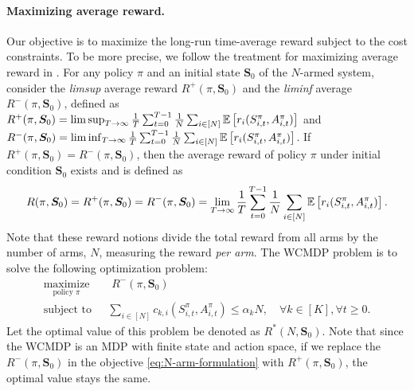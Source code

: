 \documentclass[11pt,letterpaper]{article}
\begin{document}
\paragraph{Maximizing average reward.}
Our objective is to maximize the long-run time-average reward subject to the cost constraints.
To be more precise, we follow the treatment for maximizing average reward in \citep{Put_05}. 
For any policy $\pi$ and an initial state $\bm{S}_0$ of the $N$-armed system, 
consider the \emph{limsup} average reward $R^+(\pi,\bm{S}_0)$ and the \emph{liminf} average  $R^-(\pi,\bm{S}_0)$, defined as $R^+(\pi,\bm{S}_0)=\lim\sup_{T\to\infty}\frac{1}{T}\sum_{t=0}^{T-1}\frac{1}{N}\sum_{i\in[N]}\mathbb{E}\left[r_i(S_{i,t}^\pi, A_{i,t}^\pi)\right]$ and $R^-(\pi,\bm{S}_0)=\lim\inf_{T\to\infty}\frac{1}{T}\sum_{t=0}^{T-1}\frac{1}{N}\sum_{i\in[N]}\mathbb{E}\left[r_i(S_{i,t}^\pi, A_{i,t}^\pi)\right]$. 
If $R^+(\pi,\bm{S}_0)=R^-(\pi,\bm{S}_0)$, then the average reward of policy $\pi$ under initial condition $\bm{S}_0$ exists and is defined as
\begin{equation}
    R(\pi,\bm{S}_0) = R^+(\pi,\bm{S}_0) = R^-(\pi,\bm{S}_0)=\lim_{T\to\infty}\frac{1}{T}\sum_{t=0}^{T-1}\frac{1}{N}\sum_{i\in[N]}\mathbb{E}\left[r_i(S_{i,t}^\pi, A_{i,t}^\pi)\right].
\end{equation}
Note that these reward notions divide the total reward from all arms by the number of arms, $N$, measuring the reward \emph{per arm}.
The WCMDP problem is to solve the following optimization problem:
\begin{subequations}\label{eq:WCMDP}
\begin{align}
    \label{eq:N-arm-formulation} 
    \underset{\text{policy } \pi}{\text{maximize}} &\quad R^-(\pi,\bm{S}_0)\\
    \text{subject to}  
    &\mspace{12mu}  \sum_{i\in[N]} c_{k,i}(S_{i,t}^\pi, A_{i,t}^\pi)\le \alpha_k N,\quad \forall k\in[K],\forall t\ge 0. \label{eq:hard-budget-constraint}
\end{align}
\end{subequations}
Let the optimal value of this problem be denoted as $R^*(N,\bm{S}_0)$.
Note that since the WCMDP is an MDP with finite state and action space, if we replace the $R^-(\pi,\bm{S}_0)$ in the objective \eqref{eq:N-arm-formulation} with $R^+(\pi,\bm{S}_0)$, the optimal value stays the same.
\end{document}
